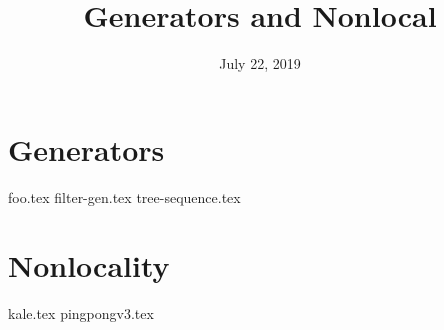 \documentclass{exam}
\title{Generators and Nonlocal}
\date{July 22, 2019}
\begin{document}
\maketitle

\section{Generators}
\begin{questions}
{foo.tex}
{filter-gen.tex}
{tree-sequence.tex}
\end{questions}

\section{Nonlocality}
\begin{questions}
{kale.tex}
{pingpongv3.tex}
\end{questions}
\end{document}
